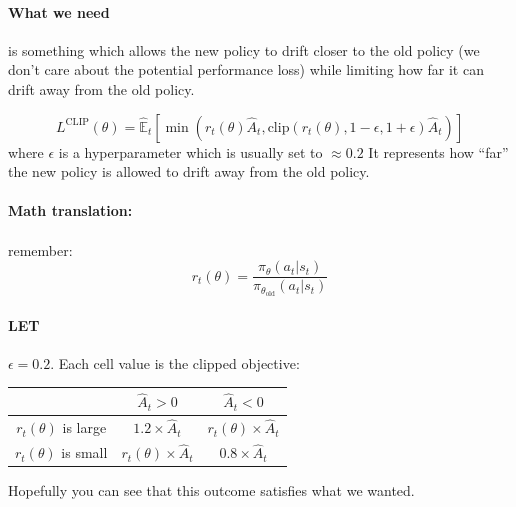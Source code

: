 \documentclass{article}
\begin{document}
\paragraph{What we need} is something which allows the new policy to drift closer to the old policy (we don't care about the potential performance loss) while limiting how far it can drift away from the old policy.

\[
    L^{\text{CLIP}} (\theta) = \hat{\mathbb{E}}_t \left [ \min(  r_t (\theta) \hat{A}_t , \text{clip}(r_t (\theta), 1 - \epsilon, 1 + \epsilon)\hat{A}_t ) \right]
\]
where \(\epsilon\) is a hyperparameter which is usually set to \(\approx 0.2\) It represents how ``far'' the new policy is allowed to drift away from the old policy.

\paragraph{Math translation:}
\paragraph{}remember:
\[r_t(\theta) = \frac{\pi_\theta (a_t | s_t)}{\pi_{\theta_{\text{old}}} (a_t | s_t)}\]

\paragraph{LET} \(\epsilon = 0.2\). Each cell value is the clipped objective:
\begin{center}
    \begin{tabular}{ c|c|c| } 
    & \(\hat{A}_{t} > 0\)  & \(\hat{A}_{t} < 0\)  \\
    \hline
    \(r_t (\theta) \) is large & \(1.2 \times \hat{A}_t\)  & \(r_t(\theta) \times \hat{A}_t\)  \\
    \hline
    \(r_t (\theta) \) is small & \(r_t(\theta) \times \hat{A}_t\) & \(0.8 \times \hat{A}_t\) 
\end{tabular}
\end{center}
    
Hopefully you can see that this outcome satisfies what we wanted. 
\end{document}
